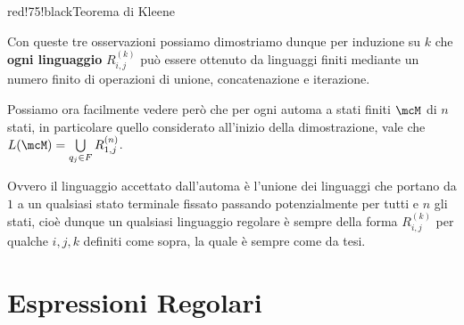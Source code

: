\begin{halfframedbox}{red!75!black}{Teorema di Kleene}
\begin{itemize}
\begin{center}
  \end{center}
  \medskip

  Con queste tre osservazioni possiamo dimostriamo dunque per induzione su \(k\) che \textbf{ogni linguaggio } \(R^{(k)}_{i,j}\) può essere ottenuto da linguaggi finiti mediante un numero finito di operazioni di unione, concatenazione e iterazione.

  Possiamo ora facilmente vedere però che per ogni automa a stati finiti \(\mcM\) di \(n\) stati, in particolare quello considerato all'inizio della dimostrazione, vale che \(L(\mcM)= \bigcup\limits_{q_j \in F}R^{(n)}_{1,j}\).

  Ovvero il linguaggio accettato dall'automa è l'unione dei linguaggi che portano da \(1\) a un qualsiasi stato terminale fissato passando potenzialmente per tutti e \(n\) gli stati,
  cioè dunque un qualsiasi linguaggio regolare è sempre della forma \(R^{(k)}_{i,j}\) per qualche \(i,j,k\) definiti come sopra, la quale è sempre come da tesi.
\end{itemize}
\end{halfframedbox}

\newpage

\section{Espressioni Regolari}

